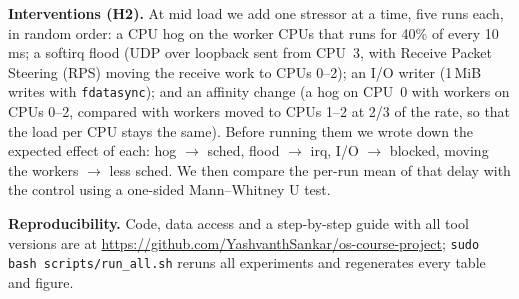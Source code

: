 \textbf{Interventions (H2).} At mid load we add one stressor at a time, five
runs each, in random order: a CPU hog on the worker CPUs that runs for 40\%
of every 10\,ms; a softirq flood (UDP over loopback sent from CPU~3, with
Receive Packet Steering (RPS) moving the receive work to CPUs 0--2); an I/O writer (1\,MiB writes
with \texttt{fdatasync}); and an affinity change (a hog on CPU~0 with
workers on CPUs 0--2, compared with workers moved to CPUs 1--2 at 2/3 of
the rate, so that the load per CPU stays the same). Before running them we
wrote down the expected effect of each: hog $\to$ sched, flood $\to$ irq,
I/O $\to$ blocked, moving the workers $\to$ less sched. We then compare the
per-run mean of that delay with the control using a one-sided Mann--Whitney
U test.

\textbf{Reproducibility.} Code, data access and a step-by-step guide with
all tool versions are at
\url{https://github.com/YashvanthSankar/os-course-project};
\texttt{sudo bash scripts/run\_all.sh} reruns all experiments and
regenerates every table and figure.
